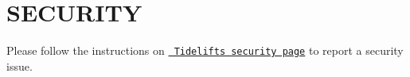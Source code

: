 \chapter{SECURITY}
\hypertarget{md_node__modules_2mongoose_2_s_e_c_u_r_i_t_y}{}\label{md_node__modules_2mongoose_2_s_e_c_u_r_i_t_y}
Please follow the instructions on \href{https://tidelift.com/docs/security}{\texttt{ Tidelift\textquotesingle{}s security page}} to report a security issue. 